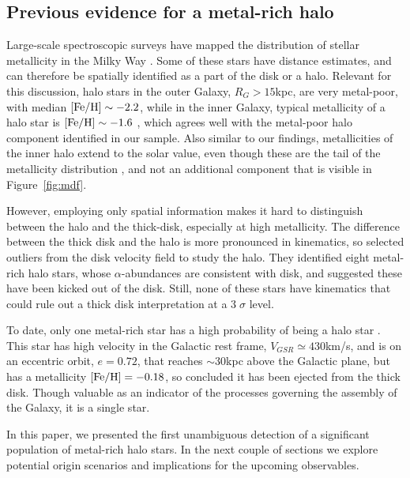 \documentclass[apj, twocolappendix, numberedappendix, appendixfloats]{emulateapj}
\begin{document}
\subsection{Previous evidence for a metal-rich halo}
\label{sec:previous}
Large-scale spectroscopic surveys have mapped the distribution of stellar metallicity in the Milky Way \citep[e.g.,][]{ivezic2008}.
Some of these stars have distance estimates, and can therefore be spatially identified as a part of the disk or a halo.
Relevant for this discussion, halo stars in the outer Galaxy, $R_{G}>15$\;kpc, are very metal-poor, with median $\rm[Fe/H]\sim-2.2$, while in the inner Galaxy, typical metallicity of a halo star is $\rm[Fe/H]\sim-1.6$ \citep[e.g.,][]{carollo2007, dejong2010}, which agrees well with the metal-poor halo component identified in our sample.
Also similar to our findings, metallicities of the inner halo extend to the solar value, even though these are the tail of the metallicity distribution \citep[e.g.,][]{allendeprieto2006}, and not an additional component that is visible in Figure~\ref{fig:mdf}.

However, employing only spatial information makes it hard to distinguish between the halo and the thick-disk, especially at high metallicity.
The difference between the thick disk and the halo is more pronounced in kinematics, so \citet{sheffield2012} selected outliers from the disk velocity field to study the halo.
They identified eight metal-rich halo stars, whose $\alpha$-abundances are consistent with disk, and suggested these have been kicked out of the disk.
Still, none of these stars have kinematics that could rule out a thick disk interpretation at a $3\;\sigma$ level.

To date, only one metal-rich star has a high probability of being a halo star \citep{hawkins2015}.
This star has high velocity in the Galactic rest frame, $V_{GSR}\simeq430$\;km/s, and is on an eccentric orbit, $e=0.72$, that reaches $\sim30$\;kpc above the Galactic plane, but has a metallicity $\rm[Fe/H]=-0.18$, so \citet{hawkins2015} concluded it has been ejected from the thick disk.
Though valuable as an indicator of the processes governing the assembly of the Galaxy, it is a single star.

In this paper, we presented the first unambiguous detection of a significant population of metal-rich halo stars.
In the next couple of sections we explore potential origin scenarios and implications for the upcoming observables.
\end{document}
